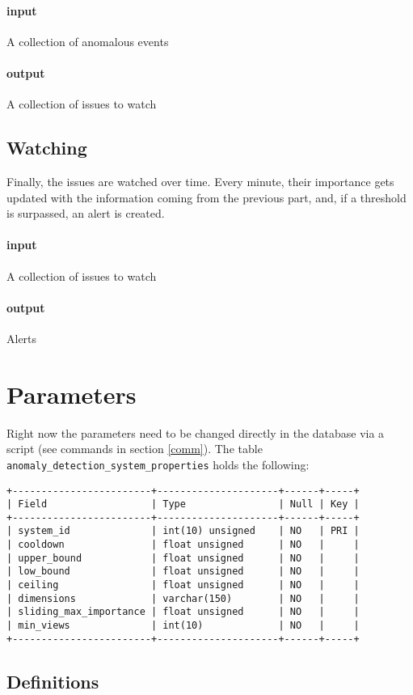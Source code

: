 \documentclass[12pt,titlepage]{article}
\begin{document}
\paragraph{input} A collection of anomalous events
\paragraph{output} A collection of issues to watch

\subsection{Watching}
Finally, the issues are watched over time. Every minute, their importance gets updated with the information coming from the previous part, and, if a threshold is surpassed, an alert is created.
\paragraph{input} A collection of issues to watch
\paragraph{output} Alerts 

\newpage

\section{Parameters}
Right now the parameters need to be changed directly in the database via a script (see commands in section \ref{comm}). The table \texttt{anomaly\_detection\_system\_properties} holds the following:
\begin{verbatim}
+------------------------+---------------------+------+-----+
| Field                  | Type                | Null | Key |
+------------------------+---------------------+------+-----+
| system_id              | int(10) unsigned    | NO   | PRI |
| cooldown               | float unsigned      | NO   |     |
| upper_bound            | float unsigned      | NO   |     |
| low_bound              | float unsigned      | NO   |     |
| ceiling                | float unsigned      | NO   |     |
| dimensions             | varchar(150)        | NO   |     |
| sliding_max_importance | float unsigned      | NO   |     |
| min_views              | int(10)             | NO   |     |
+------------------------+---------------------+------+-----+
\end{verbatim}
\subsection{Definitions}
\end{document}
